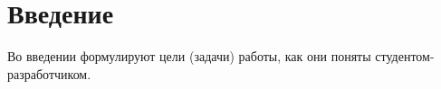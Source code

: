 \section*{Введение}

Во введении формулируют цели (задачи) работы, как они поняты студентом-разработчиком.

